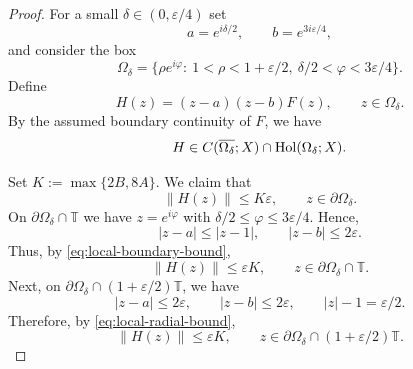 \documentclass[11pt]{amsart}
\numberwithin{equation}{section}
\theoremstyle{definition}
\theoremstyle{plain}
\begin{document}
\begin{proof}
%
%
For a small $\delta\in(0,\varepsilon/4)$ set
\[
        a=e^{i\delta/2},
        \qquad
        b=e^{3i\varepsilon/4},
\]
and consider the box
\[
        \Omega_\delta
        =
        \{\rho e^{i\varphi}:\ 1<\rho<1+\varepsilon/2,\ 
          \delta/2<\varphi<3\varepsilon/4\}.
\]
Define
\[
        H(z)
        =
        (z-a)(z-b)F(z),
        \qquad z\in\Omega_\delta.
\]
By the assumed boundary continuity of $F$, we have
\[
        H\in C(\overline{\Omega_\delta};X)
        \cap {\rm Hol}(\Omega_\delta;X).
\]

Set
\(
        K:=\max\{2B,8A\}.
\)
We claim that
\begin{equation}\label{hfunct}
        \|H(z)\|\le K\varepsilon,
        \qquad z\in\partial\Omega_\delta.
\end{equation}
On $\partial\Omega_\delta\cap\mathbb T$ we have \(z=e^{i\varphi}\) with
\(\delta/2\le\varphi\le3\varepsilon/4\). Hence, 
\[
        |z-a|\le |z-1|,\qquad
        |z-b|\le2\varepsilon.
\]
Thus, by \eqref{eq:local-boundary-bound},
\[
        \|H(z)\|
        \le\varepsilon K,\qquad z\in \partial\Omega_\delta\cap\mathbb T.
\]
Next, on $\partial\Omega_\delta\cap(1+\varepsilon/2)\mathbb T$, we have 
\[
        |z-a|\le2\varepsilon,\qquad
        |z-b|\le2\varepsilon,\qquad |z|-1=\varepsilon/2.
\]
Therefore, by \eqref{eq:local-radial-bound},
\[
        \|H(z)\|
        \le\varepsilon K,\qquad z\in \partial\Omega_\delta\cap(1+\varepsilon/2)\mathbb T.
\]


\end{proof}
\end{document}
